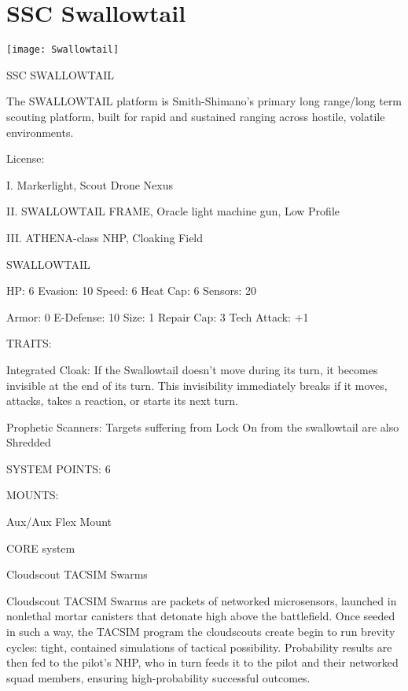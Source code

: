 \section{SSC Swallowtail}

\texttt{[image: Swallowtail]}


                                          SSC SWALLOWTAIL

The SWALLOWTAIL platform is Smith-Shimano’s primary long range/long term scouting platform,
built for rapid and sustained ranging across hostile, volatile environments.

                                                     License:





I. Markerlight, Scout Drone Nexus

II. SWALLOWTAIL FRAME,  Oracle light machine gun, Low Profile

III. ATHENA-class NHP, Cloaking Field


                                                SWALLOWTAIL

  HP: 6           Evasion: 10                            Speed: 6            Heat Cap: 6         Sensors: 20

  Armor: 0        E-Defense: 10                          Size: 1             Repair Cap: 3       Tech Attack:
                                                                                                 +1

                                                      TRAITS:

  Integrated Cloak: If the Swallowtail doesn’t move during its turn, it becomes invisible at the end of its
  turn. This invisibility immediately breaks if it moves, attacks, takes a reaction, or starts its next turn.

  Prophetic Scanners: Targets suffering from Lock On from the swallowtail are also Shredded

                                               SYSTEM POINTS: 6

                                                     MOUNTS:

  Aux/Aux                                                 Flex Mount

                                                   CORE system

                                          Cloudscout TACSIM Swarms

  Cloudscout TACSIM Swarms are packets of networked microsensors, launched in nonlethal mortar
  canisters that detonate high above the battlefield. Once seeded in such a way, the TACSIM program the
  cloudscouts create begin to run brevity cycles: tight, contained simulations of tactical possibility.
  Probability results are then fed to the pilot’s NHP, who in turn feeds it to the pilot and their networked
  squad members, ensuring high-probability successful outcomes.

